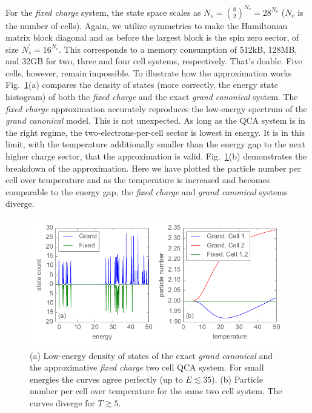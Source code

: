 For the \emph{fixed charge} system, the state space scales as $N_s =
\binom{8}{2}^{N_c} = 28^{N_c}$ ($N_c$ is the number of cells). Again, we utilize
symmetries to make the Hamiltonian matrix block diagonal and as before the
largest block is the spin zero sector, of size $N_s^{\prime} = 16^{N_c}$. This
corresponds to a memory consumption of 512kB, 128MB, and 32GB for two, three and
four cell systems, respectively. That's doable. Five cells, however, remain
impossible. To illustrate how the approximation works
Fig.~\ref{fig:fixed_charge_approximation}(a) compares the density of states
(more correctly, the energy state histogram) of both the \emph{fixed charge}
and the exact \emph{grand canonical} system. The \emph{fixed charge}
approximation accurately reproduces the low-energy spectrum of the \emph{grand
canonical} model. This is not unexpected. As long as the QCA system is in the
right regime, the two-electrons-per-cell sector is lowest in energy. It is in
this limit, with the temperature additionally smaller than the energy gap to the
next higher charge sector, that the approximation is valid.
Fig.~\ref{fig:fixed_charge_approximation}(b) demonstrates the breakdown of the
approximation. Here we have plotted the particle number per cell over
temperature and as the temperature is increased and becomes comparable to the
energy gap, the \emph{fixed charge} and \emph{grand canonical} systems diverge.
%
\begin{figure}
  \center
  \includegraphics{fixed_charge_approximation}
  \caption{(a) Low-energy density of states of the exact \emph{grand canonical}
  and the approximative \emph{fixed charge} two cell QCA system. For small
  energies the curves agree perfectly (up to $E \lesssim 35$). (b) Particle
  number per cell over temperature for the same two cell system. The curves
  diverge for $T \gtrsim 5$.}
  \label{fig:fixed_charge_approximation}
\end{figure}
%

